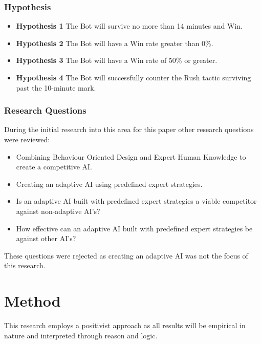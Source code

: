 \documentclass[journal]{IEEEtran}
\begin{document}
	\subsubsection{Hypothesis}
	\begin{itemize}
		\item \textbf{Hypothesis 1} The Bot will survive no more than 14 minutes and Win.
		\item \textbf{Hypothesis 2} The Bot will have a Win rate greater than 0\%.
		\item \textbf{Hypothesis 3} The Bot will have a Win rate of 50\% or greater.    
		\item \textbf{Hypothesis 4} The Bot will successfully counter the Rush tactic surviving past the 10-minute mark.
	\end{itemize}
	
	\subsubsection{Research Questions}
	During the initial research into this area for this paper other research questions were reviewed:
	\begin{itemize}
		\item Combining Behaviour Oriented Design and Expert Human Knowledge to create a competitive AI.
		
		\item Creating an adaptive AI using predefined expert strategies. 
		
		\item Is an adaptive AI built with predefined expert strategies a viable competitor against non-adaptive AI’s?
		
		\item How effective can an adaptive AI built with predefined expert strategies be against other AI’s?    
	\end{itemize}
	These questions were rejected as creating an adaptive AI was not the focus of this research.
	\newline
	
	\section{Method}
	
	
	This research employs a positivist approach as all results will be empirical in nature and interpreted through reason and logic.
	
\end{document}
